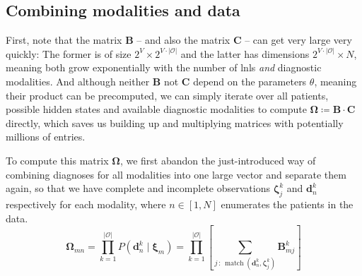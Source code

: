 \documentclass[../ms.tex]{subfiles}
\begin{document}
\subsection{Combining modalities and data}
\label{subsec:hmm_unilateral_combine}

First, note that the matrix $\mathbf{B}$ -- and also the matrix $\mathbf{C}$ -- can get very large very quickly: The former is of size $2^V \times 2^{V\cdot|\mathcal{O}|}$ and the latter has dimensions $2^{V\cdot|\mathcal{O}|} \times N$, meaning both grow exponentially with the number of \glspl{lnl} \emph{and} diagnostic modalities. And although neither $\mathbf{B}$ not $\mathbf{C}$ depend on the parameters $\theta$, meaning their product can be precomputed, we can simply iterate over all patients, possible hidden states and available diagnostic modalities to compute $\boldsymbol{\Omega} \coloneqq \mathbf{B} \cdot \mathbf{C}$ directly, which saves us building up and multiplying matrices with potentially millions of entries.

To compute this matrix $\boldsymbol{\Omega}$, we first abandon the just-introduced way of combining diagnoses for all modalities into one large vector and separate them again, so that we have complete and incomplete observations $\boldsymbol{\zeta}_j^k$ and $\mathbf{d}_n^k$ respectively for each modality, where $n \in [1,N]$ enumerates the patients in the data.
%
\begin{equation}
    \boldsymbol{\Omega}_{mn} 
    = \prod_{k=1}^{|\mathcal{O}|}{ P \left( \mathbf{d}_n^k \mid \boldsymbol{\xi}_m \right) }
    = \prod_{k=1}^{|\mathcal{O}|}{ \left[ \sum_{j \,:\, \operatorname{match}(\mathbf{d}_n^k, \boldsymbol{\zeta}_j^k) }{\mathbf{B}_{mj}^k} \right] }
\end{equation}
%
\end{document}
